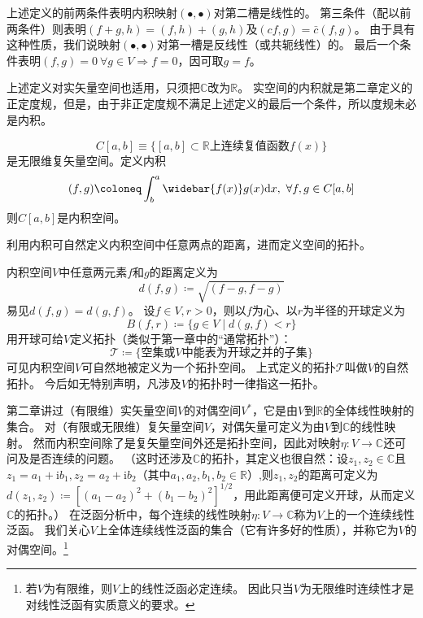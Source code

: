 \begin{note}
    上述定义的前两条件表明内积映射$(\bullet,\bullet)$对第二槽是线性的。
    第三条件（配以前两条件）则表明$(f + g, h) = (f, h) + (g, h)$及$(cf, g) = \bar{c}(f, g)$。
    由于具有这种性质，我们说映射$(\bullet,\bullet)$对第一槽是反线性（或共轭线性）的。
    最后一个条件表明$(f, g) = 0 ~ \forall g \in V \Rightarrow f = 0$，因可取$g = f$。
\end{note}

\begin{note}
    上述定义对实矢量空间也适用，只须把$\mathbb{C}$改为$\mathbb{R}$。
    实空间的内积就是第二章定义的正定度规，但是，由于非正定度规不满足上述定义的最后一个条件，所以度规未必是内积。
\end{note}

\begin{example}
    $$C[a, b] \equiv \{[a, b] \subset \mathbb{R} \text{上连续复值函数} f(x)\}$$
    是无限维复矢量空间。定义内积
    $$(f, g) \coloneq \int^a_b \widebar{f(x)}g(x)\mathrm{d}x, ~ \forall f, g \in C[a, b]$$
    则$C[a, b]$是内积空间。
\end{example}

利用内积可自然定义内积空间中任意两点的距离，进而定义空间的拓扑。

\begin{definition}
    内积空间$V$中任意两元素$f$和$g$的距离定义为
    $$d(f, g) \coloneq \sqrt{(f - g, f - g)}$$
    易见$d(f, g) = d(g, f)$。
    设$f \in V, r > 0$，则以$f$为心、以$r$为半径的开球定义为
    $$B(f, r) \coloneq \{g \in V \mid d(g, f) < r\}$$
    用开球可给$V$定义拓扑（类似于第一章中的``通常拓扑''）：
    $$\mathscr{T} \coloneq \{\text{空集或$V$中能表为开球之并的子集}\}$$
    可见内积空间$V$可自然地被定义为一个拓扑空间。
    上式定义的拓扑$\mathscr{T}$叫做$V$的自然拓扑。
    今后如无特别声明，凡涉及$V$的拓扑时一律指这一拓扑。
\end{definition}

第二章讲过（有限维）实矢量空间$V$的对偶空间$V^*$，它是由$V$到$\mathbb{R}$的全体线性映射的集合。
对（有限或无限维）复矢量空间$V$，对偶矢量可定义为由$V$到$\mathbb{C}$的线性映射。
然而内积空间除了是复矢量空间外还是拓扑空间，因此对映射$\eta \colon V \to \mathbb{C}$还可问及是否连续的问题。
（这时还涉及$\mathbb{C}$的拓扑，其定义也很自然：设$z_1, z_2 \in \mathbb{C}$且$z_1 = a_1 + \mathrm{i}b_1, z_2 = a_2 + \mathrm{i}b_2$（其中$a_1, a_2, b_1, b_2 \in \mathbb{R}$）,则$z_1, z_2$的距离可定义为$d(z_1, z_2) \coloneq [(a_1 - a_2)^2 + (b_1 - b_2)^2]^{1 / 2}$，用此距离便可定义开球，从而定义$\mathbb{C}$的拓扑。）
在泛函分析中，每个连续的线性映射$\eta \colon V \to \mathbb{C}$称为$V$上的一个连续线性泛函。
我们关心$V$上全体连续线性泛函的集合（它有许多好的性质），并称它为$V$的对偶空间。\footnote{
    若$V$为有限维，则$V$上的线性泛函必定连续。
    因此只当$V$为无限维时连续性才是对线性泛函有实质意义的要求。
}

